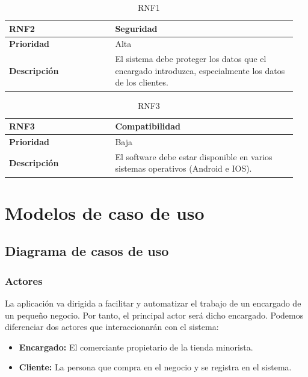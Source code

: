 \begin{table}[H]
	\centering %
	\begin{tabular}{|p{0.35\linewidth}|p{0.6\linewidth}|}
		\hline
		\rowcolor{grayshade} \textbf{RNF2} & \textbf{Seguridad} \\
		\hline
		\textbf{Prioridad} & Alta \\
		\hline
		\textbf{Descripción} & El sistema debe proteger los datos que el encargado introduzca, especialmente los datos de los clientes.\\
		\hline
	\end{tabular}
	\caption{RNF1}
\end{table}

\begin{table}[H]
	\centering %
	\begin{tabular}{|p{0.35\linewidth}|p{0.6\linewidth}|}
		\hline
		\rowcolor{grayshade} \textbf{RNF3} & \textbf{Compatibilidad} \\
		\hline
		\textbf{Prioridad} & Baja \\
		\hline
		\textbf{Descripción} & El software debe estar disponible en varios sistemas operativos (Android e IOS).\\
		\hline
	\end{tabular}
	\caption{RNF3}
\end{table}

\newpage

\section{Modelos de caso de uso}

\subsection{Diagrama de casos de uso}

\subsubsection{Actores}

La aplicación va dirigida a facilitar y automatizar el trabajo de un encargado de un pequeño negocio. Por tanto, el principal actor será dicho encargado. Podemos diferenciar dos actores que interaccionarán con el sistema: 

\begin{itemize}
	\item \textbf{Encargado:} El comerciante propietario de la tienda minorista. 
	\item \textbf{Cliente:} La persona que compra en el negocio y se registra en el sistema. 
\end{itemize}


